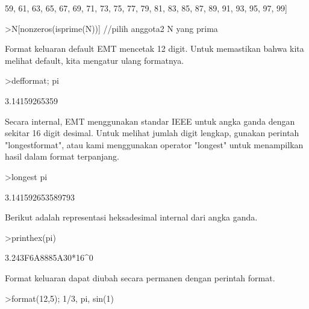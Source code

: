 \documentclass[a4paper,10pt]{article}
\begin{document}
\begin{eulernotebook}
\begin{euleroutput}
  59,  61,  63,  65,  67,  69,  71,  73,  75,  77,  79,  81,  83,  85,
  87,  89,  91,  93,  95,  97,  99]
\end{euleroutput}
\begin{eulerprompt}
>N[nonzeros(isprime(N))] //pilih anggota2 N yang prima
\end{eulerprompt}
\begin{euleroutput}
  [2,  3,  5,  7,  11,  13,  17,  19,  23,  29,  31,  37,  41,  43,  47,
  53,  59,  61,  67,  71,  73,  79,  83,  89,  97]
\end{euleroutput}
\begin{eulercomment}
Format keluaran default EMT mencetak 12 digit. Untuk memastikan bahwa
kita melihat default, kita mengatur ulang formatnya.
\end{eulercomment}
\begin{eulerprompt}
>defformat; pi
\end{eulerprompt}
\begin{euleroutput}
  3.14159265359
\end{euleroutput}
\begin{eulercomment}
Secara internal, EMT menggunakan standar IEEE untuk angka ganda dengan
sekitar 16 digit desimal. Untuk melihat jumlah digit lengkap, gunakan
perintah "longestformat", atau kami menggunakan operator "longest"
untuk menampilkan hasil dalam format terpanjang.
\end{eulercomment}
\begin{eulerprompt}
>longest pi
\end{eulerprompt}
\begin{euleroutput}
        3.141592653589793 
\end{euleroutput}
\begin{eulercomment}
Berikut adalah representasi heksadesimal internal dari angka ganda.
\end{eulercomment}
\begin{eulerprompt}
>printhex(pi)
\end{eulerprompt}
\begin{euleroutput}
  3.243F6A8885A30*16^0
\end{euleroutput}
\begin{eulercomment}
Format keluaran dapat diubah secara permanen dengan perintah format.
\end{eulercomment}
\begin{eulerprompt}
>format(12,5); 1/3, pi, sin(1)
\end{eulerprompt}
\begin{euleroutput}

\end{euleroutput}
\end{eulernotebook}
\end{document}
